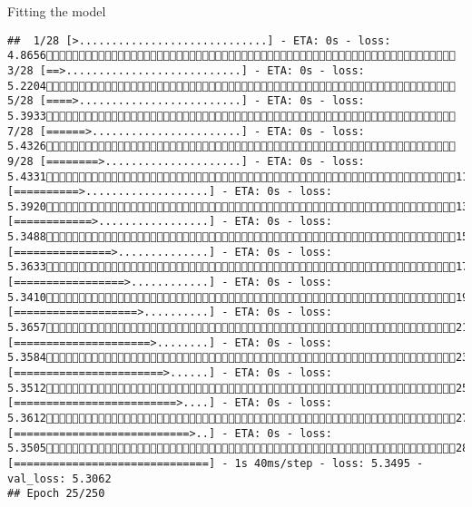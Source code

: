 \documentclass[
  ignorenonframetext,
]{beamer}
\begin{document}
\begin{frame}[fragile]{Fitting the model}
\begin{verbatim}
##  1/28 [>.............................] - ETA: 0s - loss: 4.8656 3/28 [==>...........................] - ETA: 0s - loss: 5.2204 5/28 [====>.........................] - ETA: 0s - loss: 5.3933 7/28 [======>.......................] - ETA: 0s - loss: 5.4326 9/28 [========>.....................] - ETA: 0s - loss: 5.433111/28 [==========>...................] - ETA: 0s - loss: 5.392013/28 [============>.................] - ETA: 0s - loss: 5.348815/28 [===============>..............] - ETA: 0s - loss: 5.363317/28 [=================>............] - ETA: 0s - loss: 5.341019/28 [===================>..........] - ETA: 0s - loss: 5.365721/28 [=====================>........] - ETA: 0s - loss: 5.358423/28 [=======================>......] - ETA: 0s - loss: 5.351225/28 [=========================>....] - ETA: 0s - loss: 5.361227/28 [===========================>..] - ETA: 0s - loss: 5.350528/28 [==============================] - 1s 40ms/step - loss: 5.3495 - val_loss: 5.3062
## Epoch 25/250

\end{verbatim}
\end{frame}
\end{document}
